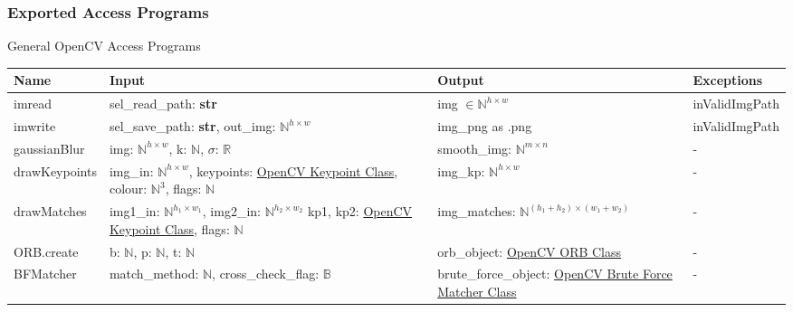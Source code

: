 \documentclass[12pt, titlepage]{article}
\begin{document}
\subsubsection{Exported Access Programs}
General OpenCV Access Programs
\begin{center}
\begin{tabular}{p{3.5cm} p{4.5cm} p{4.5cm} p{3cm}}
\hline
\textbf{Name} & \textbf{Input} & \textbf{Output} & \textbf{Exceptions} \\
\hline
imread & sel\_read\_path: \textbf{str} & 
img $\in \mathbb{N}^{h \times w}$ & inValidImgPath \\
\hline
imwrite & sel\_save\_path: \textbf{str}, \newline 
out\_img: $\mathbb{N}^{h \times w}$ & 
img\_png as .png & inValidImgPath \\
\hline
gaussianBlur & img: $\mathbb{N}^{h \times w}$, \newline 
k: $\mathbb{N}$, \newline 
$\sigma$: $\mathbb{R}$
& smooth\_img: $\mathbb{N}^{m\times n}$ & -\\
\hline
drawKeypoints & img\_in: $\mathbb{N}^{h \times w}$, \newline
keypoints: \href{https://docs.opencv.org/3.4/d2/d29/classcv_1_1KeyPoint.html}{OpenCV Keypoint Class}, \newline
colour: $\mathbb{N}^{3}$, \newline 
flags: $\mathbb{N}$ 
& img\_kp: $\mathbb{N}^{h \times w}$ & - \\
\hline
drawMatches& img1\_in: $\mathbb{N}^{h_{1} \times w_{1}}$, \newline 
img2\_in: $\mathbb{N}^{h_{2} \times w_{2}}$ \newline 
kp1, kp2: \href{https://docs.opencv.org/3.4/d2/d29/classcv_1_1KeyPoint.html}{OpenCV Keypoint Class}, \newline
flags: $\mathbb{N}$
& img\_matches: $\mathbb{N}^{(h_{1}+h_{2}) \times (w_{1}+w_{2})}$
& - \\
\hline
ORB.create & b: $\mathbb{N}$, \newline 
p: $\mathbb{N}$, \newline 
t: $\mathbb{N}$ \newline 
& orb\_object: \href{https://docs.opencv.org/3.4/db/d95/classcv_1_1ORB.html}
{OpenCV ORB Class} & - \\
\hline
BFMatcher 
& match\_method: $\mathbb{N}$, \newline 
cross\_check\_flag: $\mathbb{B}$ 
& brute\_force\_object: \href{https://docs.opencv.org/3.4/d3/da1/classcv_1_1BFMatcher.html}
{OpenCV Brute Force Matcher Class} \newline 
& -\\
\hline
\end{tabular}
\end{center} 
\end{document}
